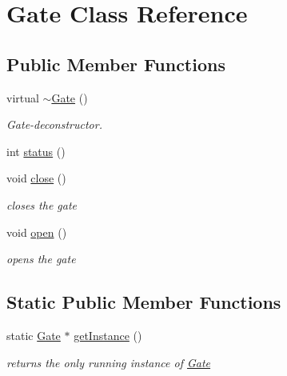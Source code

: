 \hypertarget{classGate}{\section{Gate Class Reference}
\label{classGate}
}
\subsection*{Public Member Functions}
\begin{DoxyCompactItemize}
\item 
\hypertarget{classGate_aa04556acb1cdc5715e38ced8f28c6b27}{virtual \hyperlink{classGate_aa04556acb1cdc5715e38ced8f28c6b27}{$\sim$\-Gate} ()}\label{classGate_aa04556acb1cdc5715e38ced8f28c6b27}

\begin{DoxyCompactList}\small\item\em Gate-\/deconstructor. \end{DoxyCompactList}\item 
int \hyperlink{classGate_a612d63f09ecbc825508af7cf0a9e245b}{status} ()
\item 
\hypertarget{classGate_a3733611cc86dfe641915fcbfaf4d41c8}{void \hyperlink{classGate_a3733611cc86dfe641915fcbfaf4d41c8}{close} ()}\label{classGate_a3733611cc86dfe641915fcbfaf4d41c8}

\begin{DoxyCompactList}\small\item\em closes the gate \end{DoxyCompactList}\item 
\hypertarget{classGate_a6b6e01294cd8f5dbb5c93831c5cd3c3f}{void \hyperlink{classGate_a6b6e01294cd8f5dbb5c93831c5cd3c3f}{open} ()}\label{classGate_a6b6e01294cd8f5dbb5c93831c5cd3c3f}

\begin{DoxyCompactList}\small\item\em opens the gate \end{DoxyCompactList}\end{DoxyCompactItemize}
\subsection*{Static Public Member Functions}
\begin{DoxyCompactItemize}
\item 
\hypertarget{classGate_ac4ffd53b738c40cd854b2eb0ed7c6d23}{static \hyperlink{classGate}{Gate} $\ast$ \hyperlink{classGate_ac4ffd53b738c40cd854b2eb0ed7c6d23}{get\-Instance} ()}\label{classGate_ac4ffd53b738c40cd854b2eb0ed7c6d23}

\begin{DoxyCompactList}\small\item\em returns the only running instance of \hyperlink{classGate}{Gate} \end{DoxyCompactList}\end{DoxyCompactItemize}



